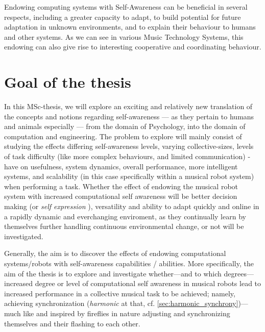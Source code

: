 Endowing computing systems with Self-Awareness can be beneficial in several respects, including a greater capacity to adapt, to build potential for future adaptation in unknown environments, and to explain their behaviour to humans and other systems. As we can see in various Music Technology Systems, this endowing can also give rise to interesting cooperative and coordinating behaviour.




\section{Goal of the thesis} %

In this MSc-thesis, we will explore an exciting and relatively new translation of the concepts and notions regarding self-awareness — as they pertain to humans and animals especially — from the domain of Psychology, into the domain of computation and engineering. The problem to explore will mainly consist of studying the effects differing self-awareness levels, varying collective-sizes, levels of task difficulty (like more complex behaviours, and limited communication) - have on usefulness, system dynamics, overall performance, more intelligent systems, and scalability (in this case specifically within a musical robot system) when performing a task. Whether the effect of endowing the musical robot system with increased computational self awareness will be better decision making (or \textit{self expression} \cite{sacs16_ch2}), versatility and ability to adapt quickly and online in a rapidly dynamic and everchanging enviroment, as they continually learn by themselves further handling continuous environmental change, or not will be investigated.

Generally, the aim is to discover the effects of endowing computational systems/robots with self-awareness capabilities / abilities. More specifically, the aim of the thesis is to explore and investigate whether—and to which degrees—increased degree or level of computational self awareness in musical robots lead to increased performance in a collective musical task to be achieved; namely, achieving synchronization (\textit{harmonic} at that, cf. \ref{sec:harmonic_synchrony})—much like and inspired by fireflies in nature adjusting and synchronizing themselves and their flashing to each other.

